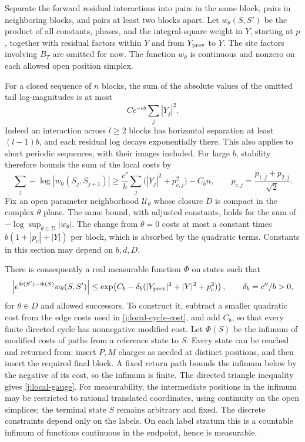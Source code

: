 Separate the forward residual interactions into pairs in the same block,
pairs in neighboring blocks, and pairs at least two blocks apart. Let
$w_\theta(S,S')$ be the product of all constants, phases, and the
integral-square weight in $Y$, starting at $p$, together with residual
factors within $Y$ and from $Y_{\rm prev}$ to $Y$. The site factors
involving $B_T$ are omitted for now. The function $w_\theta$ is continuous
and nonzero on each allowed open position simplex.

For a closed sequence of $n$ blocks, the sum of the absolute values of
the omitted tail log-magnitudes is at most
\[
 C e^{-cb}\sum_j |Y_j|^2.
\]
Indeed an interaction across $l\ge2$ blocks has horizontal separation at
least $(l-1)b$, and each residual log decays exponentially there. This
also applies to short periodic sequences, with their images included.
For large $b$, stability therefore bounds the sum of the local costs by
\begin{equation}\label{j:local-cycle-cost}
 \sum_j-\log|w_0(S_j,S_{j+1})|
 \ge \frac{c'}b\sum_j\bigl(|Y_j|^2+p_{c,j}^2\bigr)-C_b n,
 \qquad p_{c,j}=\frac{p_{1,j}+p_{2,j}}{\sqrt2}.
\end{equation}
Fix an open parameter neighborhood $\mathcal U_\theta$ whose closure $D$ is compact in
the complex $\theta$ plane.
The same bound, with adjusted constants, holds for the sum of
$-\log\sup_{\theta\in D}|w_\theta|$. The change from $\theta=0$ costs at
most a constant times $b(1+|p_c|+|Y|)$ per block, which is absorbed by
the quadratic terms. Constants in this section may depend on $b,d,D$.

There is consequently a real measurable function $\Phi$ on states such
that
\begin{equation}\label{j:local-gauge}
 \left|e^{\Phi(S')-\Phi(S)}w_\theta(S,S')\right|
 \le \exp\!\left(C_b-\delta_b
       (|Y_{\rm prev}|^2+|Y|^2+p_c^2)\right),
 \qquad \delta_b=c''/b>0,
\end{equation}
for $\theta\in D$ and allowed successors. To construct it, subtract a
smaller quadratic cost from the edge costs used in
\eqref{j:local-cycle-cost}, and add $C_b$, so that every finite directed
cycle has nonnegative modified cost. Let $\Phi(S)$ be the infimum of
modified costs of paths from a reference state to $S$. Every state can
be reached and returned from: insert $P,M$ charges as needed at distinct
positions, and then insert the required final block. A fixed return path
bounds the infimum below by the negative of its cost, so the infimum is
finite. The directed triangle inequality gives \eqref{j:local-gauge}.
For measurability, the intermediate positions in the infimum may be
restricted to rational translated coordinates, using continuity on the
open simplices; the terminal state $S$ remains arbitrary and fixed.
The discrete constraints depend only on the labels. On each label
stratum this is a countable infimum of functions continuous in the
endpoint, hence is measurable.

